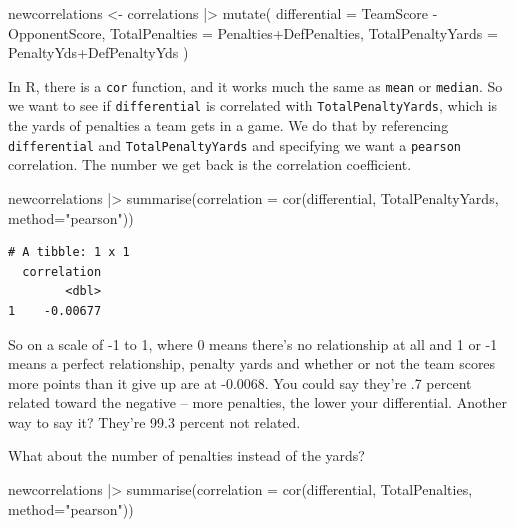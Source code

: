 \documentclass[
  letterpaper,
  DIV=11,
  numbers=noendperiod]{scrreprt}
\newenvironment{Shaded}{\begin{snugshade}}{\end{snugshade}}
\newcommand{\AttributeTok}[1]{\textcolor[rgb]{0.40,0.45,0.13}{#1}}
\newcommand{\FunctionTok}[1]{\textcolor[rgb]{0.28,0.35,0.67}{#1}}
\newcommand{\NormalTok}[1]{\textcolor[rgb]{0.00,0.23,0.31}{#1}}
\newcommand{\OtherTok}[1]{\textcolor[rgb]{0.00,0.23,0.31}{#1}}
\newcommand{\SpecialCharTok}[1]{\textcolor[rgb]{0.37,0.37,0.37}{#1}}
\newcommand{\StringTok}[1]{\textcolor[rgb]{0.13,0.47,0.30}{#1}}
\begin{document}
\begin{Shaded}
\begin{Highlighting}[]
\NormalTok{newcorrelations }\OtherTok{\textless{}{-}}\NormalTok{ correlations }\SpecialCharTok{|\textgreater{}} 
  \FunctionTok{mutate}\NormalTok{(}
    \AttributeTok{differential =}\NormalTok{ TeamScore }\SpecialCharTok{{-}}\NormalTok{ OpponentScore, }
    \AttributeTok{TotalPenalties =}\NormalTok{ Penalties}\SpecialCharTok{+}\NormalTok{DefPenalties, }
    \AttributeTok{TotalPenaltyYards =}\NormalTok{ PenaltyYds}\SpecialCharTok{+}\NormalTok{DefPenaltyYds}
\NormalTok{    )}
\end{Highlighting}
\end{Shaded}

In R, there is a \texttt{cor} function, and it works much the same as
\texttt{mean} or \texttt{median}. So we want to see if
\texttt{differential} is correlated with \texttt{TotalPenaltyYards},
which is the yards of penalties a team gets in a game. We do that by
referencing \texttt{differential} and \texttt{TotalPenaltyYards} and
specifying we want a \texttt{pearson} correlation. The number we get
back is the correlation coefficient.

\begin{Shaded}
\begin{Highlighting}[]
\NormalTok{newcorrelations }\SpecialCharTok{|\textgreater{}} \FunctionTok{summarise}\NormalTok{(}\AttributeTok{correlation =} \FunctionTok{cor}\NormalTok{(differential, TotalPenaltyYards, }\AttributeTok{method=}\StringTok{"pearson"}\NormalTok{))}
\end{Highlighting}
\end{Shaded}

\begin{verbatim}
# A tibble: 1 x 1
  correlation
        <dbl>
1    -0.00677
\end{verbatim}

So on a scale of -1 to 1, where 0 means there's no relationship at all
and 1 or -1 means a perfect relationship, penalty yards and whether or
not the team scores more points than it give up are at -0.0068. You
could say they're .7 percent related toward the negative -- more
penalties, the lower your differential. Another way to say it? They're
99.3 percent not related.

What about the number of penalties instead of the yards?

\begin{Shaded}
\begin{Highlighting}[]
\NormalTok{newcorrelations }\SpecialCharTok{|\textgreater{}} 
  \FunctionTok{summarise}\NormalTok{(}\AttributeTok{correlation =} \FunctionTok{cor}\NormalTok{(differential, TotalPenalties, }\AttributeTok{method=}\StringTok{"pearson"}\NormalTok{))}
\end{Highlighting}
\end{Shaded}
\end{document}
